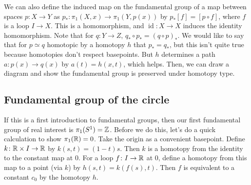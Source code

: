 We can also define the induced map on the fundamental group of a map between spaces $p \colon X \to Y$ as $p_* \colon \pi_1(X,x) \to \pi_1(Y,p(x))$ by $p_*[f]=[p\circ f]$, where $f$ is a loop $I\to X$. This is a homomorphism, and $\operatorname{id}\colon X \to X$ induces the identity homomorphism. Note that for $q \colon Y \to Z$, $q_* \circ p_* = (q\circ p)_*$. We would like to say that for $p \simeq q$ homotopic by a homotopy $h$ that $p_*=q_*$, but this isn't quite true because homotopies don't respect basepoints. But $h$ determines a path $a \colon p(x) \to q(x)$ by $a(t)=h(x,t)$, which helps. Then, we can draw a diagram and show the fundamental group is preserved under homotopy type.
\subsection{Fundamental group of the circle}
If this is a first introduction to fundamental groups, then our first fundamental group of real interest is $\pi_1(S^{1} )=\mathbb{Z}$. Before we do this, let's do a quick calculation to show $\pi_1(\mathbb{R})=0$. Take the origin as a convenient basepoint. Define $k \colon \mathbb{R}\times I \to \mathbb{R}$ by $k(s,t)=(1-t)s$. Then $k$ is a homotopy from the identity to the constant map at $0$. For a loop $f \colon I \to \mathbb{R}$ at $0$, define a homotopy from this map to a point (via $k$) by $h(s,t)=k(f(s),t).$ Then $f$ is equivalent to a constant $c_0$ by the homotopy $h$.

